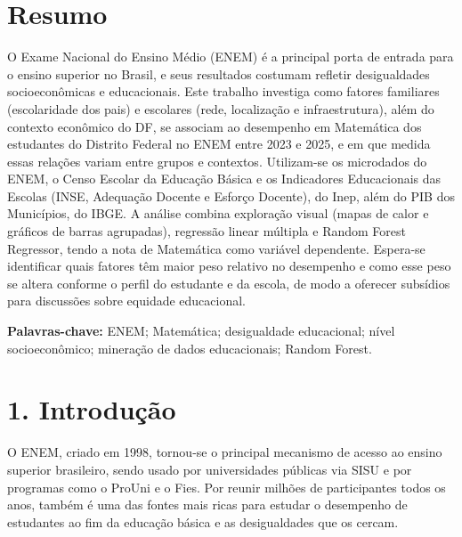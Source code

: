 \documentclass[twocolumn,10pt,a4paper]{article}
\begin{document}
\section*{Resumo}

O Exame Nacional do Ensino Médio (ENEM) é a principal porta de entrada para o ensino superior no Brasil, e seus resultados costumam refletir desigualdades socioeconômicas e educacionais. Este trabalho investiga como fatores familiares (escolaridade dos pais) e escolares (rede, localização e infraestrutura), além do contexto econômico do DF, se associam ao desempenho em Matemática dos estudantes do Distrito Federal no ENEM entre 2023 e 2025, e em que medida essas relações variam entre grupos e contextos. Utilizam-se os microdados do ENEM, o Censo Escolar da Educação Básica e os Indicadores Educacionais das Escolas (INSE, Adequação Docente e Esforço Docente), do Inep, além do PIB dos Municípios, do IBGE. A análise combina exploração visual (mapas de calor e gráficos de barras agrupadas), regressão linear múltipla e Random Forest Regressor, tendo a nota de Matemática como variável dependente. Espera-se identificar quais fatores têm maior peso relativo no desempenho e como esse peso se altera conforme o perfil do estudante e da escola, de modo a oferecer subsídios para discussões sobre equidade educacional.

\textbf{Palavras-chave:} ENEM; Matemática; desigualdade educacional; nível socioeconômico; mineração de dados educacionais; Random Forest.

\section*{1. Introdução}

O ENEM, criado em 1998, tornou-se o principal mecanismo de acesso ao ensino superior brasileiro, sendo usado por universidades públicas via SISU e por programas como o ProUni e o Fies. Por reunir milhões de participantes todos os anos, também é uma das fontes mais ricas para estudar o desempenho de estudantes ao fim da educação básica e as desigualdades que os cercam.
\end{document}
